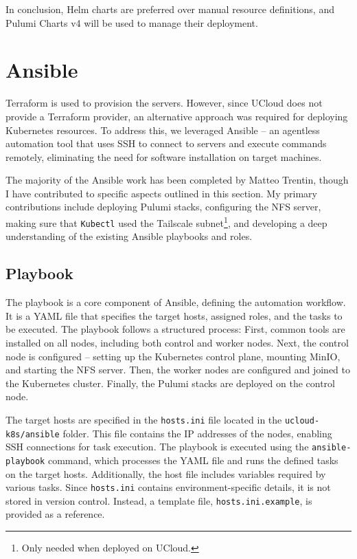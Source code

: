 In conclusion, Helm charts are preferred over manual resource definitions, and Pulumi Charts v4 will be used to manage their deployment.

\section{Ansible}
Terraform is used to provision the servers. However, since UCloud does not provide a Terraform provider, an alternative approach was required for deploying Kubernetes resources. To address this, we leveraged Ansible -- an agentless automation tool that uses SSH to connect to servers and execute commands remotely, eliminating the need for software installation on target machines.

The majority of the Ansible work has been completed by Matteo Trentin, though I have contributed to specific aspects outlined in this section. My primary contributions include deploying Pulumi stacks, configuring the NFS server, making sure that \texttt{Kubectl} used the Tailscale subnet\footnote{Only needed when deployed on UCloud.}, and developing a deep understanding of the existing Ansible playbooks and roles.

\subsection{Playbook}
The playbook is a core component of Ansible, defining the automation workflow. It is a YAML file that specifies the target hosts, assigned roles, and the tasks to be executed. The playbook follows a structured process: First, common tools are installed on all nodes, including both control and worker nodes. Next, the control node is configured -- setting up the Kubernetes control plane, mounting MinIO, and starting the NFS server. Then, the worker nodes are configured and joined to the Kubernetes cluster. Finally, the Pulumi stacks are deployed on the control node.

The target hosts are specified in the \texttt{hosts.ini} file located in the \texttt{ucloud-k8s/\allowbreak ansible} folder. This file contains the IP addresses of the nodes, enabling SSH connections for task execution. The playbook is executed using the \texttt{ansible-playbook} command, which processes the YAML file and runs the defined tasks on the target hosts. Additionally, the host file includes variables required by various tasks. Since \texttt{hosts.ini} contains environment-specific details, it is not stored in version control. Instead, a template file, \texttt{hosts.ini.example}, is provided as a reference.

